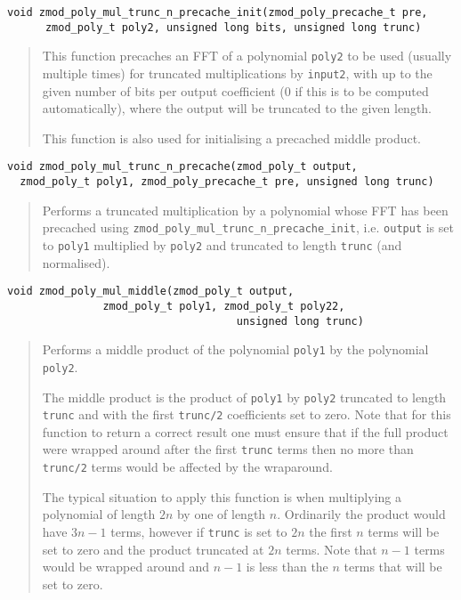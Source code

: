 \documentclass[a4paper,10pt]{article}
\newcommand{\code}{\lstinline}
\begin{document}
\begin{lstlisting}
void zmod_poly_mul_trunc_n_precache_init(zmod_poly_precache_t pre,
      zmod_poly_t poly2, unsigned long bits, unsigned long trunc)
\end{lstlisting}
\begin{quote}
This function precaches an FFT of a polynomial \code{poly2} to be used (usually multiple times) for truncated multiplications by \code{input2}, with up to the given number of bits per output coefficient (0 if this is to be computed automatically), where the output will be truncated to the given length.  

This function is also used for initialising a precached middle product. 
\end{quote}

\begin{lstlisting}
void zmod_poly_mul_trunc_n_precache(zmod_poly_t output,
  zmod_poly_t poly1, zmod_poly_precache_t pre, unsigned long trunc)
\end{lstlisting}
\begin{quote}
Performs a truncated multiplication by a polynomial whose FFT has been precached using \code{zmod_poly_mul_trunc_n_precache_init}, i.e. \code{output} is set to \code{poly1} multiplied by \code{poly2} and truncated to length \code{trunc} (and normalised). 
\end{quote}

\begin{lstlisting}
void zmod_poly_mul_middle(zmod_poly_t output,
               zmod_poly_t poly1, zmod_poly_t poly22,
                                    unsigned long trunc)
\end{lstlisting}
\begin{quote}
Performs a middle product of the polynomial \code{poly1} by the polynomial \code{poly2}.

The middle product is the product of \code{poly1} by \code{poly2} truncated to length \code{trunc} and with the first \code{trunc/2} coefficients set to zero. Note that for this function to return a correct result one must ensure that if the full product were wrapped around after the first \code{trunc} terms then no more than \code{trunc/2} terms would be affected by the wraparound. 

The typical situation to apply this function is when multiplying a polynomial of length $2n$ by one of length $n$. Ordinarily the product would have $3n - 1$ terms, however if \code{trunc} is set to $2n$ the first $n$ terms will be set to zero and the product truncated at $2n$ terms. Note that $n - 1$ terms would be wrapped around and $n-1$ is less than the $n$ terms that will be set to zero.  
\end{quote}
\end{document}

